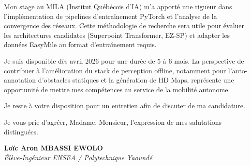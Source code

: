 \documentclass[a4paper,11pt]{article}
\begin{document}
Mon stage au MILA (Institut Québécois d'IA) m'a apporté une rigueur dans l'implémentation de pipelines d'entraînement PyTorch et l'analyse de la convergence des réseaux. Cette méthodologie de recherche sera utile pour évaluer les architectures candidates (Superpoint Transformer, EZ-SP) et adapter les données EasyMile au format d'entraînement requis.

Je suis disponible dès avril 2026 pour une durée de 5 à 6 mois. La perspective de contribuer à l'amélioration du stack de perception offline, notamment pour l'auto-annotation d'obstacles statiques et la génération de HD Maps, représente une opportunité de mettre mes compétences au service de la mobilité autonome.

Je reste à votre disposition pour un entretien afin de discuter de ma candidature.

Je vous prie d'agréer, Madame, Monsieur, l'expression de mes salutations distinguées.

\vspace{0.8cm}

\textbf{Loïc Aron MBASSI EWOLO}\\
\textit{Élève-Ingénieur ENSEA / Polytechnique Yaoundé}
\end{document}

